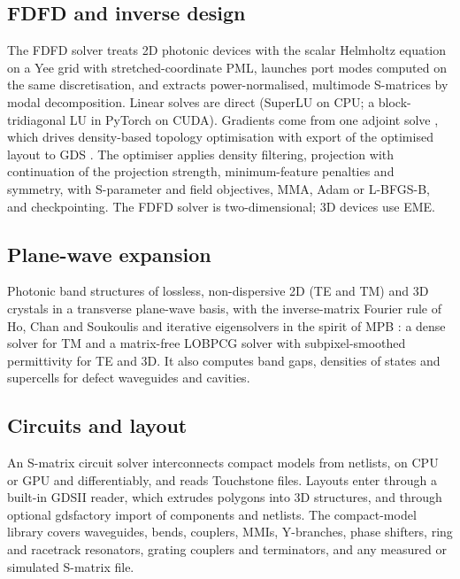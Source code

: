 \documentclass[11pt]{article}
\begin{document}
\subsection{FDFD and inverse design}
\label{sec:fdfd}
The FDFD solver treats 2D photonic devices with the scalar Helmholtz equation on a Yee grid with
stretched-coordinate PML, launches port modes computed on the same discretisation, and extracts
power-normalised, multimode S-matrices by modal decomposition. Linear solves are direct (SuperLU on
CPU; a block-tridiagonal LU in PyTorch on CUDA). Gradients come from one adjoint solve
\cite{Hughes2018adjoint}, which drives density-based topology optimisation with export of the
optimised layout to GDS \cite{BendsoeSigmund2004,Molesky2018}. The optimiser applies density
filtering, projection with continuation of the projection strength, minimum-feature penalties and
symmetry, with S-parameter and field objectives, MMA, Adam or L-BFGS-B, and checkpointing. The FDFD
solver is two-dimensional; 3D devices use EME.

\subsection{Plane-wave expansion}
Photonic band structures of lossless, non-dispersive 2D (TE and TM) and 3D crystals in a transverse
plane-wave basis, with the inverse-matrix Fourier rule of Ho, Chan and Soukoulis \cite{Ho1990} and
iterative eigensolvers in the spirit of MPB \cite{JohnsonJoannopoulos2001mpb}: a dense solver for TM
and a matrix-free LOBPCG solver with subpixel-smoothed permittivity for TE and 3D. It also computes band
gaps, densities of states and supercells for defect waveguides and cavities.

\subsection{Circuits and layout}
An S-matrix circuit solver interconnects compact models from netlists, on CPU or GPU and
differentiably, and reads Touchstone files. Layouts enter through a built-in GDSII reader, which
extrudes polygons into 3D structures, and through optional gdsfactory import of components and
netlists. The compact-model library covers waveguides, bends, couplers, MMIs, Y-branches, phase
shifters, ring and racetrack resonators, grating couplers and terminators, and any measured or
simulated S-matrix file.

\end{document}
